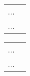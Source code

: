 \addchap{\lsAbbreviationsTitle}

\begin{tabularx}{.45\textwidth}{lQ}
... & \\
... & \\
\end{tabularx}
\begin{tabularx}{.45\textwidth}{lQ}
... & \\
... & \\
\end{tabularx}

